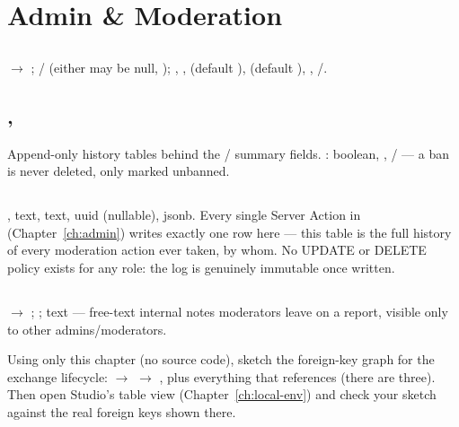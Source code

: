 \section{Admin \& Moderation}

\subsection*{}
 $\to$ ; / (either may be null, ); , ,  (default ),  (default ), , /.

\subsection*{, }
Append-only history tables behind the / summary fields. :  boolean, , / — a ban is never deleted, only marked unbanned.

\subsection*{}
,  text,  text,  uuid (nullable),  jsonb. Every single Server Action in  (Chapter~\ref{ch:admin}) writes exactly one row here — this table is the full history of every moderation action ever taken, by whom. No UPDATE or DELETE policy exists for any role: the log is genuinely immutable once written.

\subsection*{}
 $\to$ ; ;  text — free-text internal notes moderators leave on a report, visible only to other admins/moderators.

\begin{olktask}
Using only this chapter (no source code), sketch the foreign-key graph for the exchange lifecycle:  $\to$  $\to$ , plus everything that references  (there are three). Then open Studio's table view (Chapter~\ref{ch:local-env}) and check your sketch against the real foreign keys shown there.
\end{olktask}
